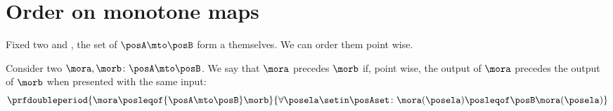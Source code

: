 \section{Order on monotone maps}

Fixed two  \posA and \posB, the set of  $\posA \mto \posB$ form a  themselves.
We can order them point wise.

\begin{definition}
    \label{def:order-monotone-maps}
    Consider two  $\mora,\morb\colon\posA\mto\posB$.
    We say that $\mora$ precedes $\morb$ if, point wise, the output of $\mora$ precedes the output of $\morb$ when presented with the same input:
    \begin{equation}
        \prfdoubleperiod{
            \mora \posleqof{\posA\mto\posB} \morb
        }{
            \forall \posela\setin\posAset \colon \mora(\posela) \posleqof\posB \mora(\posela)
        }
    \end{equation}
\end{definition}

